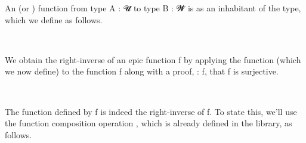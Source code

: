 An  (or ) function from type \ab A \as : \ab 𝓤\af ̇ to type \ab B \as : \ab 𝓦\af ̇ is as an inhabitant of the  type, which we define as follows.
\ccpad
\begin{code}%
\>[1]\AgdaSpace{}%
\AgdaSymbol{:}\AgdaSpace{}%
\AgdaSymbol{(}\AgdaSpace{}%
\AgdaSymbol{:}\AgdaSpace{}%
\AgdaSpace{}%
\AgdaSpace{}%
\AgdaSymbol{)}\AgdaSpace{}%
%
\>[23]\AgdaSpace{}%
\AgdaSpace{}%
\AgdaSpace{}%
\<%
\\
%
\>[1]\AgdaSpace{}%
\AgdaSpace{}%
\AgdaSymbol{=}\AgdaSpace{}%
\AgdaSpace{}%
\AgdaSpace{}%
\AgdaSpace{}%
\AgdaSpace{}%
\AgdaSpace{}%
\AgdaSpace{}%
\<%
\end{code}
\ccpad
We obtain the right-inverse of an epic function \ab f by applying the function  (which we now define) to the function \ab f along with a proof,  \as :  \ab f, that \ab f is surjective.
\ccpad
\begin{code}%
\>[1]\AgdaSpace{}%
\AgdaSymbol{:}\AgdaSpace{}%
\AgdaSymbol{(}\AgdaSpace{}%
\AgdaSymbol{:}\AgdaSpace{}%
\AgdaSpace{}%
\AgdaSpace{}%
\AgdaSymbol{)}\AgdaSpace{}%
\AgdaSpace{}%
\AgdaSpace{}%
\AgdaSpace{}%
\AgdaSpace{}%
\AgdaSpace{}%
\AgdaSpace{}%
\<%
\\
%
\>[1]\AgdaSpace{}%
\AgdaSpace{}%
\AgdaSpace{}%
\AgdaSpace{}%
\AgdaSymbol{=}\AgdaSpace{}%
\AgdaSpace{}%
\AgdaSpace{}%
\AgdaSymbol{(}\AgdaSpace{}%
\AgdaSymbol{)}\<%
\end{code}
\ccpad
The function defined by  \ab f  is indeed the right-inverse of \ab f. To state this, we'll use the function composition operation , which is already defined in the \typetopology library, as follows.
\ccpad
